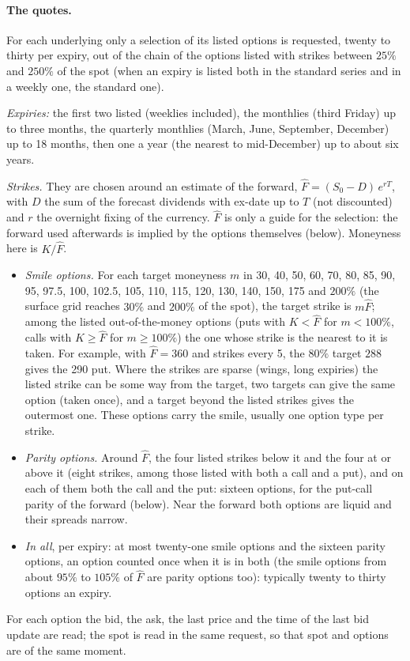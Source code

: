\paragraph{The quotes.} For each underlying only a selection of its listed options is requested, twenty to thirty
per expiry, out of the chain of the options listed with strikes between $25\%$ and $250\%$ of the spot (when an expiry
is listed both in the standard series and in a weekly one, the standard one).

\emph{Expiries:} the first two listed (weeklies included), the monthlies (third Friday) up to three months, the
quarterly monthlies (March, June, September, December) up to 18 months, then one a year (the nearest to mid-December)
up to about six years.

\emph{Strikes.} They are chosen around an estimate of the forward,
$\hat F = (S_0 - D)\,e^{rT}$, with $D$ the sum of the forecast dividends with ex-date up to $T$ (not discounted) and
$r$ the overnight fixing of the currency. $\hat F$ is only a guide for the selection: the forward used afterwards is
implied by the options themselves (below). Moneyness here is $K/\hat F$.
\begin{itemize}[nosep]
  \item \emph{Smile options.} For each target moneyness $m$ in 30, 40, 50, 60, 70, 80, 85, 90, 95, 97.5, 100, 102.5,
        105, 110, 115, 120, 130, 140, 150, 175 and $200\%$ (the surface grid reaches $30\%$ and $200\%$ of the spot), the target strike is $m\hat F$; among the listed out-of-the-money options
        (puts with $K < \hat F$ for $m < 100\%$, calls with $K \ge \hat F$ for $m \ge 100\%$) the one whose strike is
        the nearest to it is taken. For example, with $\hat F = 360$ and strikes every 5, the $80\%$ target $288$
        gives the 290 put. Where the strikes are sparse (wings, long expiries) the listed strike can be some way from
        the target, two targets can give the same option (taken once), and a target beyond the listed strikes gives
        the outermost one. These options carry the smile, usually one option type per strike.
  \item \emph{Parity options.} Around $\hat F$, the four listed strikes below it and the four at or above it (eight
        strikes, among those listed with both a call and a put), and on each of them both the call and the put:
        sixteen options, for the put-call parity of the forward (below). Near the forward both options are liquid and
        their spreads narrow.
  \item \emph{In all}, per expiry: at most twenty-one smile options and the sixteen parity options, an option counted
        once when it is in both (the smile options from about $95\%$ to $105\%$ of $\hat F$ are parity options too):
        typically twenty to thirty options an expiry.
\end{itemize}
For each option the bid, the ask, the last price and the time of the last bid update are read; the spot is read in
the same request, so that spot and options are of the same moment.

